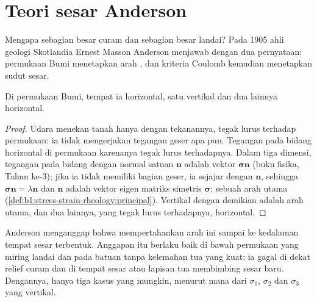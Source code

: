 \section{Teori sesar Anderson}\label{sec:b1:faults-folds-fabrics:anderson}

Mengapa sebagian besar  curam dan sebagian besar  landai? Pada 1905 ahli geologi Skotlandia Ernest Masson Anderson menjawab dengan dua pernyataan: permukaan Bumi menetapkan arah , dan kriteria Coulomb kemudian menetapkan sudut sesar.

\begin{proposition}\label{prop:b1:faults-folds-fabrics:free-surface}
Di permukaan Bumi, tempat ia horizontal, satu  vertikal dan dua lainnya horizontal.
\end{proposition}

\begin{proof}
Udara menekan tanah hanya dengan tekanannya, tegak lurus terhadap permukaan: ia tidak mengerjakan tegangan geser apa pun. Tegangan pada bidang horizontal di permukaan karenanya tegak lurus terhadapnya. Dalam tiga dimensi, tegangan pada bidang dengan normal satuan $\mathbf n$ adalah vektor $\boldsymbol\sigma\mathbf n$ (buku fisika, Tahun ke-3); jika ia tidak memiliki bagian geser, ia sejajar dengan $\mathbf n$, sehingga $\boldsymbol\sigma\mathbf n = \lambda\mathbf n$ dan $\mathbf n$ adalah vektor eigen matriks simetris $\boldsymbol\sigma$: sebuah arah utama (\cref{def:b1:stress-strain-rheology:principal}). Vertikal dengan demikian adalah arah utama, dan dua lainnya, yang tegak lurus terhadapnya, horizontal.
\end{proof}

Anderson menganggap bahwa  mempertahankan arah ini sampai ke kedalaman tempat sesar terbentuk. Anggapan itu berlaku baik di bawah permukaan yang miring landai dan pada batuan tanpa kelemahan tua yang kuat; ia gagal di dekat relief curam dan di tempat sesar atau lapisan tua membimbing sesar baru. Dengannya, hanya tiga kasus yang mungkin, menurut mana dari $\sigma_1$, $\sigma_2$ dan $\sigma_3$ yang vertikal.

